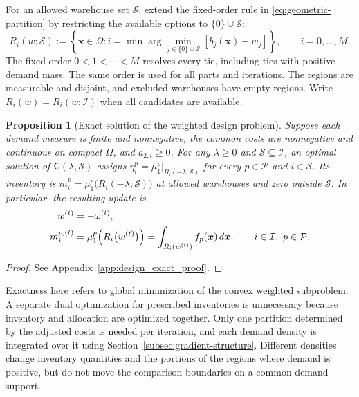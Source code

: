 \documentclass[a4paper,fleqn]{cas-sc}
\newtheorem{proposition}[theorem]{Proposition}
\theoremstyle{remark}
\theoremstyle{plain}
\begin{document}
For an allowed warehouse set $\mathcal S$, extend the fixed-order rule in \eqref{eq:geometric-partition} by restricting the available options to $\{0\}\cup\mathcal S$:
\begin{equation}
    R_i(w;\mathcal S):=\left\{\bm x\in\Omega:
        i=\min\arg\min_{j\in\{0\}\cup\mathcal S}[b_j(\bm x)-w_j]\right\},\qquad i=0,\ldots,M.
    \label{eq:design_partition}
\end{equation}
The fixed order $0<1<\cdots<M$ resolves every tie, including ties with positive demand mass. The same order is used for all parts and iterations. The regions are measurable and disjoint, and excluded warehouses have empty regions. Write $R_i(w)=R_i(w;\mathcal I)$ when all candidates are available.

\begin{proposition}[Exact solution of the weighted design problem]
\label{prop:exact_design_update}
Suppose each demand measure is finite and nonnegative, the common costs are nonnegative and continuous on compact $\Omega$, and $a_{2,i}\ge0$. For any $\lambda\ge0$ and $\mathcal S\subseteq\mathcal I$, an optimal solution of $\mathsf G(\lambda,\mathcal S)$ assigns $\eta_i^p=\mu_1^p|_{R_i(-\lambda;\mathcal S)}$ for every $p\in\mathcal P$ and $i\in\mathcal S$. Its inventory is $m_i^p=\mu_1^p\bigl(R_i(-\lambda;\mathcal S)\bigr)$ at allowed warehouses and zero outside $\mathcal S$. In particular, the resulting update is
\begin{subequations}\label{eq:design_update}
\begin{align}
    w^{(t)}&=-\omega^{(t)},\label{eq:design_threshold}\\
    m_i^{p,(t)}&=\mu_1^p\Bigl(R_i\bigl(w^{(t)}\bigr)\Bigr)
        =\int_{R_i(w^{(t)})}f_p(\bm x)\,d\bm x,
        \qquad i\in\mathcal I,\ p\in\mathcal P.\label{eq:design_inventory}
\end{align}
\end{subequations}
\end{proposition}
\begin{proof}
See Appendix~\ref{app:design_exact_proof}.
\end{proof}

Exactness here refers to global minimization of the convex weighted subproblem. A separate dual optimization for prescribed inventories is unnecessary because inventory and allocation are optimized together. Only one partition determined by the adjusted costs is needed per iteration, and each demand density is integrated over it using Section~\ref{subsec:gradient-structure}. Different densities change inventory quantities and the portions of the regions where demand is positive, but do not move the comparison boundaries on a common demand support.
\end{document}
